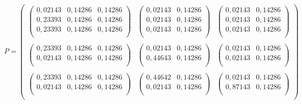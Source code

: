 \begingroup
\makeatletter
\def\f@size{8}
\check@mathfonts
\begin{equation}
\label{eq:separated_p_matrix_example}
	P =
	\begin{pmatrix}
		\begin{pmatrix}
			0,02143 & 0,14286 & 0,14286 \\
			0,23393 & 0,14286 & 0,14286 \\
			0,23393 & 0,14286 & 0,14286 \\
		\end{pmatrix} &
		\begin{pmatrix}
			0,02143 & 0,14286 \\
			0,02143 & 0,14286 \\
			0,02143 & 0,14286 \\
		\end{pmatrix} &
		\begin{pmatrix}
			0,02143 & 0,14286 \\
			0,02143 & 0,14286 \\
			0,02143 & 0,14286 \\
		\end{pmatrix} \\ \\

		\begin{pmatrix}
			0,23393 & 0,14286 & 0,14286 \\
			0,02143 & 0,14286 & 0,14286 \\
		\end{pmatrix} &
		\begin{pmatrix}
			0,02143 & 0,14286 \\
			0,44643 & 0,14286 \\
		\end{pmatrix} &
		\begin{pmatrix}
			0,02143 & 0,14286 \\
			0,02143 & 0,14286 \\
		\end{pmatrix} \\ \\

		\begin{pmatrix}
			0,23393 & 0,14286 & 0,14286 \\
			0,02143 & 0,14286 & 0,14286 \\
		\end{pmatrix} &
		\begin{pmatrix}
			0,44642 & 0,14286 \\
			0,02143 & 0,14286 \\
		\end{pmatrix} &
		\begin{pmatrix}
			0,02143 & 0,14286 \\
			0,87143 & 0,14286\\
		\end{pmatrix} \\
	\end{pmatrix}
\end{equation}
\endgroup

